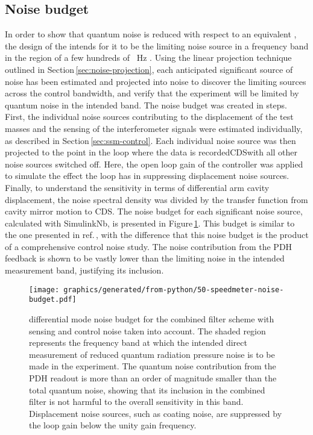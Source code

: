 \subsection{\label{sec:noise-budget}Noise budget}

In order to show that quantum noise is reduced with respect to an equivalent \MI{}, the design of the \SSMEXPT{} intends for it to be the limiting noise source in a frequency band in the region of a few hundreds of \SI{}{\hertz} \cite{Graef2014}. Using the linear projection technique outlined in Section\,\ref{sec:noise-projection}, each anticipated significant source of noise has been estimated and projected into \LMINUS{} noise to discover the limiting sources across the control bandwidth, and verify that the experiment will be limited by quantum noise in the intended band. The noise budget was created in steps. First, the individual noise sources contributing to the displacement of the test masses and the sensing of the interferometer signals were estimated individually, as described in Section\,\ref{sec:ssm-control}. Each individual noise source was then projected to the point in the loop where the data is recorded\textemdash \gls{CDS}\textemdash with all other noise sources switched off. Here, the open loop gain of the controller was applied to simulate the effect the loop has in suppressing displacement noise sources. Finally, to understand the sensitivity in terms of differential arm cavity displacement, the noise spectral density was divided by the transfer function from cavity mirror motion to \gls{CDS}. The noise budget for each significant noise source, calculated with SimulinkNb, is presented in Figure\,\ref{fig:noise-budget}. This budget is similar to the one presented in ref.\,\cite{Graef2014}, with the difference that this noise budget is the product of a comprehensive control noise study. The noise contribution from the \gls{PDH} feedback is shown to be vastly lower than the limiting noise in the intended measurement band, justifying its inclusion.

\begin{figure}
  \texttt{[image: graphics/generated/from-python/50-speedmeter-noise-budget.pdf]}
  \caption[Control noise budget for the \SSMEXPT{}]{\label{fig:noise-budget}\SSM{} differential mode noise budget for the combined filter scheme with sensing and control noise taken into account. The shaded  region represents the frequency band at which the intended direct measurement of reduced quantum radiation pressure noise is to be made in the experiment. The quantum noise contribution from the PDH readout is more than an order of magnitude smaller than the total quantum noise, showing that its inclusion in the combined filter is not harmful to the overall sensitivity in this band. Displacement noise sources, such as coating noise, are suppressed by the loop gain below the unity gain frequency.}
\end{figure}

